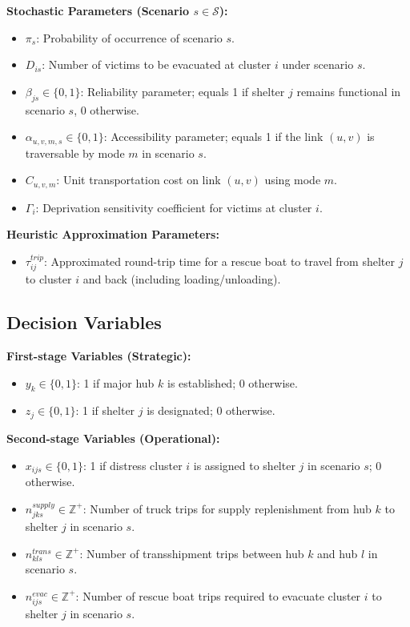 \textbf{Stochastic Parameters (Scenario $s \in \mathcal{S}$):}
\begin{itemize}
    \item $\pi_s$: Probability of occurrence of scenario $s$.
    \item $D_{is}$: Number of victims to be evacuated at cluster $i$ under scenario $s$.
    \item $\beta_{js} \in \{0,1\}$: Reliability parameter; equals 1 if shelter $j$ remains functional in scenario $s$, 0 otherwise.
    \item $\alpha_{u,v,m,s} \in \{0,1\}$: Accessibility parameter; equals 1 if the link $(u,v)$ is traversable by mode $m$ in scenario $s$.
    \item $C_{u,v,m}$: Unit transportation cost on link $(u,v)$ using mode $m$.
    \item $\Gamma_i$: Deprivation sensitivity coefficient for victims at cluster $i$.
\end{itemize}

\textbf{Heuristic Approximation Parameters:}
\begin{itemize}
    \item $\tau_{ij}^{trip}$: Approximated round-trip time for a rescue boat to travel from shelter $j$ to cluster $i$ and back (including loading/unloading).
\end{itemize}

\subsection*{Decision Variables}

\textbf{First-stage Variables (Strategic):}
\begin{itemize}
    \item $y_k \in \{0,1\}$: 1 if major hub $k$ is established; 0 otherwise.
    \item $z_j \in \{0,1\}$: 1 if shelter $j$ is designated; 0 otherwise.
\end{itemize}

\textbf{Second-stage Variables (Operational):}
\begin{itemize}
    \item $x_{ijs} \in \{0,1\}$: 1 if distress cluster $i$ is assigned to shelter $j$ in scenario $s$; 0 otherwise.
    \item $n_{jks}^{supply} \in \mathbb{Z}^+$: Number of truck trips for supply replenishment from hub $k$ to shelter $j$ in scenario $s$.
    \item $n_{kls}^{trans} \in \mathbb{Z}^+$: Number of transshipment trips between hub $k$ and hub $l$ in scenario $s$.
    \item $n_{ijs}^{evac} \in \mathbb{Z}^+$: Number of rescue boat trips required to evacuate cluster $i$ to shelter $j$ in scenario $s$.
\end{itemize}

